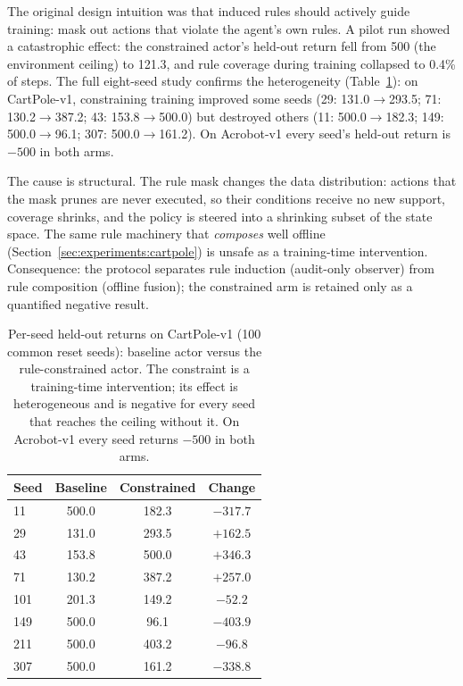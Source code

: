 \documentclass[11pt]{article}
\begin{document}
The original design intuition was that induced rules should actively guide training: mask out
actions that violate the agent's own rules. A pilot run showed a catastrophic effect: the
constrained actor's held-out return fell from 500 (the environment ceiling) to 121.3, and rule
coverage during training collapsed to 0.4\% of steps. The full eight-seed study confirms the
heterogeneity (Table~\ref{tab:perseed}): on CartPole-v1, constraining training improved some seeds
(29: 131.0$\rightarrow$293.5; 71: 130.2$\rightarrow$387.2; 43: 153.8$\rightarrow$500.0) but
destroyed others (11: 500.0$\rightarrow$182.3; 149: 500.0$\rightarrow$96.1; 307:
500.0$\rightarrow$161.2). On Acrobot-v1 every seed's held-out return is $-500$ in both arms.

The cause is structural. The rule mask changes the data distribution: actions that the mask prunes
are never executed, so their conditions receive no new support, coverage shrinks, and the policy is
steered into a shrinking subset of the state space. The same rule machinery that \emph{composes}
well offline (Section~\ref{sec:experiments:cartpole}) is unsafe as a training-time intervention.
Consequence: the protocol separates rule induction (audit-only observer) from rule composition
(offline fusion); the constrained arm is retained only as a quantified negative result.

\begin{table}[t]
\centering
\caption{Per-seed held-out returns on CartPole-v1 (100 common reset seeds): baseline actor versus
the rule-constrained actor. The constraint is a training-time intervention; its effect is
heterogeneous and is negative for every seed that reaches the ceiling without it. On Acrobot-v1
every seed returns $-500$ in both arms.}
\label{tab:perseed}
\begin{tabular}{lccc}
\toprule
Seed & Baseline & Constrained & Change \\
\midrule
11 & 500.0 & 182.3 & $-317.7$ \\
29 & 131.0 & 293.5 & $+162.5$ \\
43 & 153.8 & 500.0 & $+346.3$ \\
71 & 130.2 & 387.2 & $+257.0$ \\
101 & 201.3 & 149.2 & $-52.2$ \\
149 & 500.0 & 96.1 & $-403.9$ \\
211 & 500.0 & 403.2 & $-96.8$ \\
307 & 500.0 & 161.2 & $-338.8$ \\
\bottomrule
\end{tabular}
\end{table}
\end{document}
